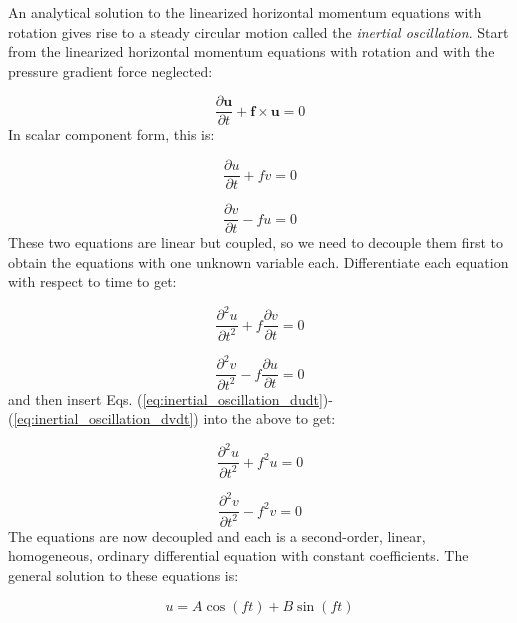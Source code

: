 \documentclass[12pt]{article}
\numberwithin{equation}{section}
\numberwithin{figure}{section}
\numberwithin{table}{section}
\begin{document}
An analytical solution to the linearized horizontal momentum equations with
rotation gives rise to a steady circular motion called the \textit{inertial
oscillation}.
Start from the linearized horizontal momentum equations with rotation
and with the pressure gradient force neglected:

\begin{equation}
  \frac{\partial \mathbf{u}}{\partial t} + \mathbf{f} \times \mathbf{u} = 0
\end{equation}
In scalar component form, this is:

\begin{equation}
  \frac{\partial u}{\partial t} + f v = 0
  \label{eq:inertial_oscillation_dudt}
\end{equation}

\begin{equation}
  \frac{\partial v}{\partial t} - f u = 0
  \label{eq:inertial_oscillation_dvdt}
\end{equation}
These two equations are linear but coupled, so we need to decouple them
first to obtain the equations with one unknown variable each.
Differentiate each equation with respect to time to get:

\begin{equation}
  \frac{\partial^2 u}{\partial t^2} + f \frac{\partial v}{\partial t} = 0
\end{equation}

\begin{equation}
  \frac{\partial^2 v}{\partial t^2} - f \frac{\partial u}{\partial t} = 0
\end{equation}
and then insert Eqs. (\ref{eq:inertial_oscillation_dudt})-(\ref{eq:inertial_oscillation_dvdt})
into the above to get:

\begin{equation}
  \frac{\partial^2 u}{\partial t^2} + f^2 u = 0
\end{equation}

\begin{equation}
  \frac{\partial^2 v}{\partial t^2} - f^2 v = 0
\end{equation}
The equations are now decoupled and each is a second-order, linear, homogeneous,
ordinary differential equation with constant coefficients.
The general solution to these equations is:

\begin{equation}
  u = A \cos(f t) + B \sin(f t)
\end{equation}
\end{document}
